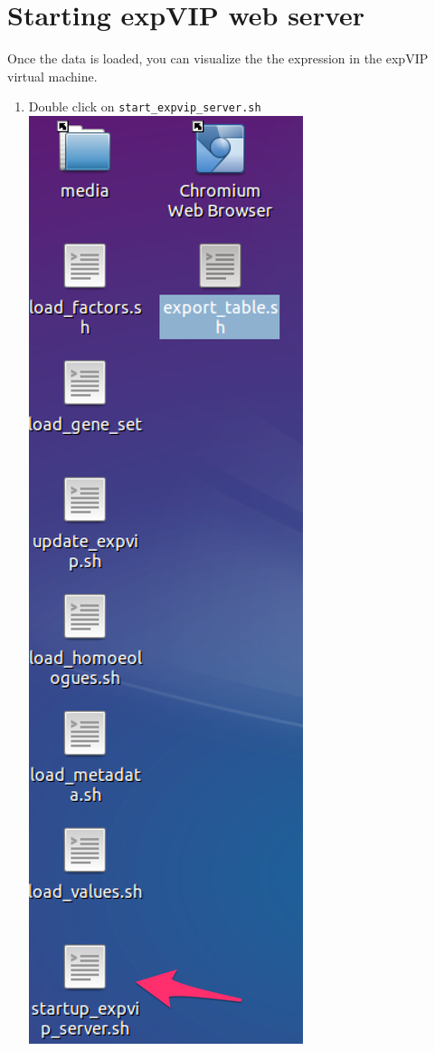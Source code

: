 \section{Starting expVIP web server}\label{starting-expvip-web-server}

Once the data is loaded, you can visualize the the expression in the
expVIP virtual machine.

\begin{enumerate}
\def\labelenumi{\arabic{enumi}.}
\itemsep1pt\parskip0pt
\item
  Double click on \lstinline!start_expvip_server.sh!
  \includegraphics{images/StartupServer01.png}

\end{enumerate}
